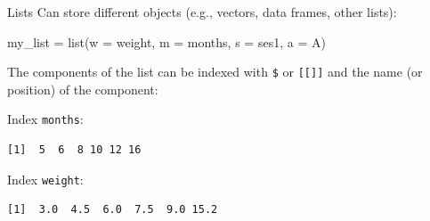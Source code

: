 \documentclass[
  ignorenonframetext,
]{beamer}
\newenvironment{Shaded}{\begin{snugshade}}{\end{snugshade}}
\newcommand{\AttributeTok}[1]{\textcolor[rgb]{0.00,0.34,0.68}{#1}}
\newcommand{\CommentTok}[1]{\textcolor[rgb]{0.54,0.53,0.53}{#1}}
\newcommand{\DecValTok}[1]{\textcolor[rgb]{0.69,0.50,0.00}{#1}}
\newcommand{\FunctionTok}[1]{\textcolor[rgb]{0.39,0.29,0.61}{#1}}
\newcommand{\NormalTok}[1]{\textcolor[rgb]{0.12,0.11,0.11}{#1}}
\newcommand{\OtherTok}[1]{\textcolor[rgb]{0.00,0.43,0.16}{#1}}
\newcommand{\StringTok}[1]{\textcolor[rgb]{0.75,0.01,0.01}{#1}}
\begin{document}
\begin{frame}[fragile]{Lists}
\protect\hypertarget{lists}{}
Can store different objects (e.g., vectors, data frames, other lists):

\begin{Shaded}
\begin{Highlighting}[]
\NormalTok{my\_list }\OtherTok{=} \FunctionTok{list}\NormalTok{(}\AttributeTok{w =}\NormalTok{ weight, }\AttributeTok{m =}\NormalTok{ months, }\AttributeTok{s =}\NormalTok{ ses1, }\AttributeTok{a =}\NormalTok{ A)}
\end{Highlighting}
\end{Shaded}

The components of the list can be indexed with \texttt{\$} or
\texttt{{[}{[}{]}{]}} and the name (or position) of the component:

Index \texttt{months}:

\begin{Shaded}
\end{Shaded}

\begin{verbatim}
[1]  5  6  8 10 12 16
\end{verbatim}

Index \texttt{weight}:

\begin{Shaded}
\end{Shaded}

\begin{verbatim}
[1]  3.0  4.5  6.0  7.5  9.0 15.2
\end{verbatim}
\end{frame}
\end{document}
